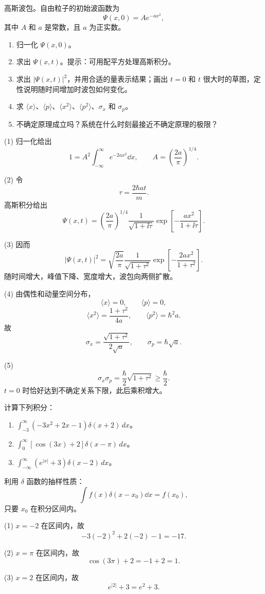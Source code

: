 \begin{question}
高斯波包。自由粒子的初始波函数为
\[
\Psi(x,0)=Ae^{-ax^2},
\]
其中 $A$ 和 $a$ 是常数，且 $a$ 为正实数。
\begin{enumerate}
\item 归一化 $\Psi(x,0)$。
\item 求出 $\Psi(x,t)$。提示：可用配平方处理高斯积分。
\item 求出 $|\Psi(x,t)|^2$，并用合适的量表示结果；画出 $t=0$ 和 $t$ 很大时的草图，定性说明随时间增加时波包如何变化。
\item 求 $\langle x\rangle$、$\langle p\rangle$、$\langle x^2\rangle$、$\langle p^2\rangle$、$\sigma_x$ 和 $\sigma_p$。
\item 不确定原理成立吗？系统在什么时刻最接近不确定原理的极限？
\end{enumerate}
\end{question}
\begin{solution}
(1) 归一化给出
\[
1=A^2\int_{-\infty}^{\infty}e^{-2ax^2}\dd x,
\qquad
A=\left(\frac{2a}{\pi}\right)^{1/4}.
\]

(2) 令
\[
\tau=\frac{2\hbar at}{m}.
\]
高斯积分给出
\[
\Psi(x,t)=\left(\frac{2a}{\pi}\right)^{1/4}\frac1{\sqrt{1+\ii\tau}}
\exp\left[-\frac{a x^2}{1+\ii\tau}\right].
\]

(3) 因而
\[
|\Psi(x,t)|^2=\sqrt{\frac{2a}{\pi}}\frac1{\sqrt{1+\tau^2}}
\exp\left[-\frac{2ax^2}{1+\tau^2}\right].
\]
随时间增大，峰值下降、宽度增大，波包向两侧扩散。

(4) 由偶性和动量空间分布，
\[
\langle x\rangle=0,
\qquad \langle p\rangle=0,
\]
\[
\langle x^2\rangle=\frac{1+\tau^2}{4a},
\qquad
\langle p^2\rangle=\hbar^2a.
\]
故
\[
\sigma_x=\frac{\sqrt{1+\tau^2}}{2\sqrt a},
\qquad
\sigma_p=\hbar\sqrt a.
\]

(5) 
\[
\sigma_x\sigma_p=\frac\hbar2\sqrt{1+\tau^2}\ge\frac\hbar2.
\]
$t=0$ 时恰好达到不确定关系下限，此后乘积增大。
\end{solution}

\begin{question}
计算下列积分：
\begin{enumerate}
\item $\displaystyle \int_{-3}^{\infty}(-3x^2+2x-1)\delta(x+2)\,dx$。
\item $\displaystyle \int_{0}^{\infty}[\cos(3x)+2]\delta(x-\pi)\,dx$。
\item $\displaystyle \int_{-\infty}^{\infty}(e^{|x|}+3)\delta(x-2)\,dx$。
\end{enumerate}
\end{question}
\begin{solution}
利用 $\delta$ 函数的抽样性质：
\[
\int f(x)\delta(x-x_0)\dd x=f(x_0),
\]
只要 $x_0$ 在积分区间内。

(1) $x=-2$ 在区间内，故
\[
-3(-2)^2+2(-2)-1=-17.
\]

(2) $x=\pi$ 在区间内，故
\[
\cos(3\pi)+2=-1+2=1.
\]

(3) $x=2$ 在区间内，故
\[
e^{|2|}+3=e^2+3.
\]
\end{solution}

